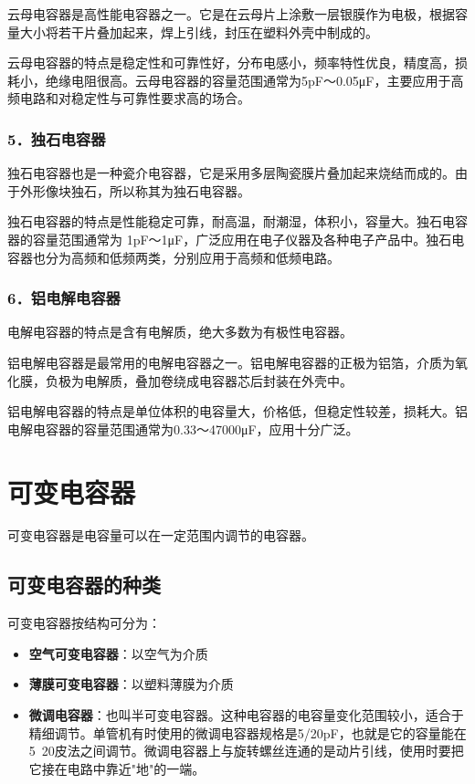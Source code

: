 \documentclass[12pt,UTF8]{ctexbook}
\begin{document}
云母电容器是高性能电容器之一。它是在云母片上涂敷一层银膜作为电极，根据容量大小将若干片叠加起来，焊上引线，封压在塑料外壳中制成的。

云母电容器的特点是稳定性和可靠性好，分布电感小，频率特性优良，精度高，损耗小，绝缘电阻很高。云母电容器的容量范围通常为5pF～0.05μF，主要应用于高频电路和对稳定性与可靠性要求高的场合。

\subsubsection{5．独石电容器}

独石电容器也是一种瓷介电容器，它是采用多层陶瓷膜片叠加起来烧结而成的。由于外形像块独石，所以称其为独石电容器。

独石电容器的特点是性能稳定可靠，耐高温，耐潮湿，体积小，容量大。独石电容器的容量范围通常为 1pF～1μF，广泛应用在电子仪器及各种电子产品中。独石电容器也分为高频和低频两类，分别应用于高频和低频电路。

\subsubsection{6．铝电解电容器}

电解电容器的特点是含有电解质，绝大多数为有极性电容器。

铝电解电容器是最常用的电解电容器之一。铝电解电容器的正极为铝箔，介质为氧化膜，负极为电解质，叠加卷绕成电容器芯后封装在外壳中。

铝电解电容器的特点是单位体积的电容量大，价格低，但稳定性较差，损耗大。铝电解电容器的容量范围通常为0.33～47000μF，应用十分广泛。

\section{可变电容器}

可变电容器是电容量可以在一定范围内调节的电容器。

\subsection{可变电容器的种类}

可变电容器按结构可分为：

\begin{itemize}[leftmargin=2cm]
	\item \textbf{空气可变电容器}：以空气为介质
	\item \textbf{薄膜可变电容器}：以塑料薄膜为介质
	\item \textbf{微调电容器}：也叫半可变电容器。这种电容器的电容量变化范围较小，适合于精细调节。单管机有时使用的微调电容器规格是5/20pF，也就是它的容量能在5~20皮法之间调节。微调电容器上与旋转螺丝连通的是动片引线，使用时要把它接在电路中靠近"地"的一端。
\end{itemize}
\end{document}
